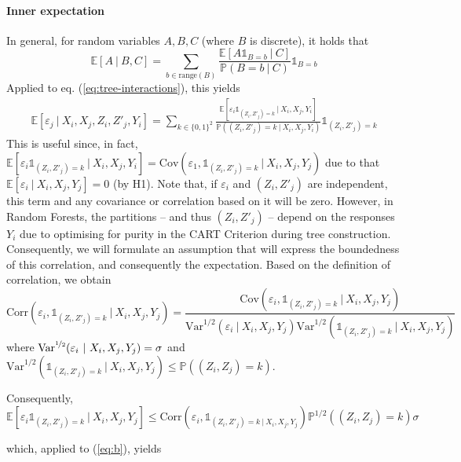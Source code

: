 \documentclass[10pt]{article}
\theoremstyle{definition}
\begin{document}
\paragraph{Inner expectation}  In general, for random variables $A, B, C$ (where $B$ is discrete), it holds that
$$
 \mathbb{E}\left[ A ~|~B, C \right]  = \sum_{b \in \text{range}(B)}  \frac{\mathbb{E}\left[ A \mathbb{1}_{B=b} ~|~ C \right]}{\mathbb{P}(B=b ~|~C)} \mathbb{1}_{B=b}
$$
Applied to eq. (\ref{eq:tree-interactions}), this yields
\begin{align}
  \mathbb{E}\left[ \varepsilon_{j} ~|~ X_{i}, X_{j}, Z_{i}, Z'_{j}, Y_{i} \right] 
  = 
\sum_{k \in \{ 0,1 \}^2}  \frac{\mathbb{E}\left[ \varepsilon_{i}
    \mathbb{1}_{(Z_{i}, Z'_{j})=k} ~|~ X_{i}, X_{j}, Y_{i}
  \right]}{\mathbb{P}((Z_{i}, Z'_{j})=k ~|~ X_{i}, X_{j}, Y_{i})}
\mathbb{1}_{(Z_{i}, Z'_{j})=k}
\label{eq:b}
\end{align}
This is useful since, in fact, $\mathbb{E}\left[ \varepsilon_{i}
  \mathbb{1}_{(Z_{i}, Z'_{j})=k} ~|~ X_{i}, X_{j}, Y_{i} \right] =
\text{Cov}(\varepsilon_{1}, \mathbb{1}_{(Z_{i}, Z'_{j})=k} ~|~ X_{i}, X_{j},
Y_{j})$ due to that $\mathbb{E}\left[ \varepsilon_{i} ~|~ X_{i}, X_{j}, Y_{j}
\right] = 0$ (by H1). Note that, if $\varepsilon_{i}$ and $(Z_{i}, Z'_j)$ are
independent, this term and any covariance or correlation based on it will be
zero. However, in Random Forests, the partitions -- and thus $(Z_{i}, Z'_{j})$ -- depend
on the responses $Y_{i}$ due to optimising for purity in the CART Criterion
during tree construction. Consequently, we will formulate an assumption that
will express the boundedness of this correlation, and consequently the
expectation. Based on the definition of correlation, we obtain
$$
\text{Corr}( \varepsilon_{i}, \mathbb{1}_{(Z_i, Z'_j)=k} ~|~ X_{i}, X_{j}, Y_{j}  ) 
= \frac{\text{Cov}(\varepsilon_{i}, \mathbb{1}_{(Z_i, Z'_j)=k}  ~|~ X_{i}, X_{j}, Y_{j} )}{
\text{Var}^{1/2}(\varepsilon_{i} ~|~ X_{i}, X_{j}, Y_{j}) \text{Var}^{1/2}(\mathbb{1}_{(Z_i, Z'_j)=k}  ~|~ X_{i}, X_{j}, Y_{j})
}
$$
where $\text{Var}^{\nicefrac{1}{2}}(\varepsilon_{i} ~|~ X_{i}, X_{j}, Y_{j}) =
\sigma$ and $\text{Var}^{1/2}(\mathbb{1}_{(Z_i, Z'_j)=k} ~|~ X_{i}, X_{j},
Y_{j}) \leq \mathbb{P}((Z_{i}, Z_{j})=k)$.

Consequently,
$$
 \mathbb{E}\left[ \varepsilon_{i} \mathbb{1}_{(Z_i, Z'_j)=k} ~|~ X_{i}, X_{j}, Y_{j} \right] 
 \leq \text{Corr}( \varepsilon_{i}, \mathbb{1}_{(Z_i, Z'_j)=k ~|~ X_{i}, X_{j}, Y_{j}} )  
 \mathbb{P}^{1/2}((Z_{i}, Z_{j})=k)
 \sigma
$$

which, applied to (\ref{eq:b}), yields
\end{document}
